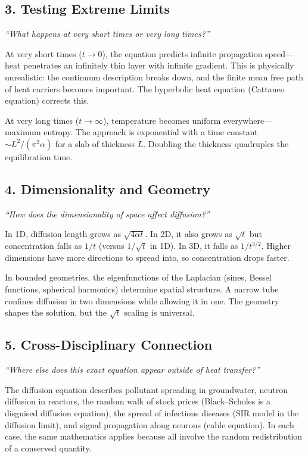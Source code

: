 \documentclass[11pt,openright]{book}
\begin{document}
\subsection*{3. Testing Extreme Limits}
\textit{``What happens at very short times or very long times?''}

At very short times ($t \to 0$), the equation predicts infinite propagation speed---heat penetrates an infinitely thin layer with infinite gradient. This is physically unrealistic: the continuum description breaks down, and the finite mean free path of heat carriers becomes important. The hyperbolic heat equation (Cattaneo equation) corrects this.

At very long times ($t \to \infty$), temperature becomes uniform everywhere---maximum entropy. The approach is exponential with a time constant $\sim L^2/(\pi^2 \alpha)$ for a slab of thickness $L$. Doubling the thickness quadruples the equilibration time.

\subsection*{4. Dimensionality and Geometry}
\textit{``How does the dimensionality of space affect diffusion?''}

In 1D, diffusion length grows as $\sqrt{4\alpha t}$. In 2D, it also grows as $\sqrt{t}$ but concentration falls as $1/t$ (versus $1/\sqrt{t}$ in 1D). In 3D, it falls as $1/t^{3/2}$. Higher dimensions have more directions to spread into, so concentration drops faster.

In bounded geometries, the eigenfunctions of the Laplacian (sines, Bessel functions, spherical harmonics) determine spatial structure. A narrow tube confines diffusion in two dimensions while allowing it in one. The geometry shapes the solution, but the $\sqrt{t}$ scaling is universal.

\subsection*{5. Cross-Disciplinary Connection}
\textit{``Where else does this exact equation appear outside of heat transfer?''}

The diffusion equation describes pollutant spreading in groundwater, neutron diffusion in reactors, the random walk of stock prices (Black--Scholes is a disguised diffusion equation), the spread of infectious diseases (SIR model in the diffusion limit), and signal propagation along neurons (cable equation). In each case, the same mathematics applies because all involve the random redistribution of a conserved quantity.
\end{document}
